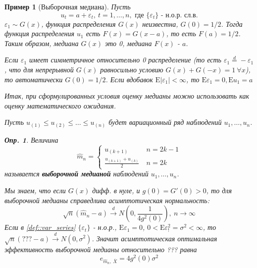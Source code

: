 \documentclass[12pt]{article}
\newtheorem{definition}{Опр.}
\newtheorem*{example}{Пример}
\theoremstyle{basic_theorem}
\theoremstyle{name_theorem}
\newcommand\defin[1]{\textbf{#1}}
\def\eps{ \varepsilon }
\def\E{ \mathrm{E} }
\begin{document}
\begin{example}[Выборочная медиана]
    Пусть
    \begin{equation} \label{def::var_series}
        u_t=a+\eps_t,\ t=1,\ldots,n,\text{ где }\{\eps_t\}\text{ - н.о.р. сл.в.}
    \end{equation} 
    $\eps_1\sim G(x)$, функция распределения $G(x)$ неизвестна,
    $G(0)=1/2$. Тогда функция распределения $u_1$ есть $F(x)=G(x-a)$,
    то есть $F(a)=1/2$. Таким образом, медиана $G(x)$ это 0, медиана $F(x)$ - $a$.
    \begin{leftbar}
        Если $\eps_1$ имеет симметричное относительно 0 распределение
        (то есть $\eps_1\overset{d}{=}-\eps_1$, что для непрерывной
        $G(x)$ равносильно условию $G(x)+G(-x)=1\ \forall x$), то
        автоматически $G(0)=1/2$. Если вдобавок $\E\lvert\eps_1\rvert<\infty$,
        то $\E\eps_1=0,\E u_1=a$
    \end{leftbar}
    Итак, при сформулированных условия оценку медианы можно использовать
    как оценку математического ожидания.

    Пусть $u_{(1)}\leq u_{(2)}\leq\ldots\leq u_{(n)}$ будет вариационный
    ряд наблюдений $u_1,\ldots,u_n$.
    \begin{definition}
        Величина
        \[
            \widehat{m}_n=\begin{cases}
                u_{(k+1)}\ &n=2k-1 \\
                \frac{u_{(k+1)} + u_{(k)}}{2}\ &n=2k
            \end{cases}
        \]
        называется \defin{выборочной медианой} наблюдений $u_1,\ldots,u_n$.
    \end{definition}

    Мы знаем, что если $G(x)$ дифф. в нуле, и $g(0) = G'(0)>0$,
    то для выборочной медианы справедлива асимптотическая нормальность:
    \[ \sqrt{n}(\widehat{m}_n - a)\xrightarrow{d}N(0, \frac{1}{4g^2(0)}),\ n\rightarrow\infty\]
    Если в \eqref{def::var_series} $\{\eps_t\}$ - н.о.р., $\E\eps_1=0$,
    $0<\E\eps_!^2=\sigma^2<\infty$, то $\sqrt{n}(???-a)\xrightarrow{d}N(0,\sigma^2)$.
    Значит асимптотическая оптимальная эффективность выборочной медианы относительно ???
    равна
    \[\boxed{e_{\widehat{m}_n,\ \overline{X}}=4g^2(0)\sigma^2}\]


\end{example}
\end{document}
